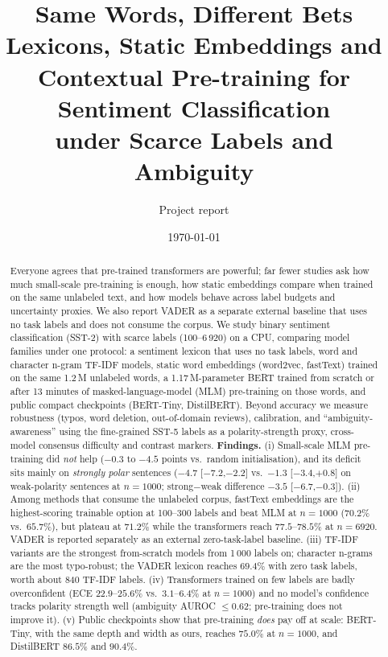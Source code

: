 \documentclass[11pt,a4paper]{article}
\title{\textbf{Same Words, Different Bets}\\[2pt]
\large Lexicons, Static Embeddings and Contextual Pre-training for Sentiment Classification\\ under Scarce Labels and Ambiguity}
\author{Project report}
\date{\today}
\begin{document}
\maketitle

\begin{abstract}
Everyone agrees that pre-trained transformers are powerful; far fewer studies ask how much small-scale pre-training is enough, how static embeddings compare when trained on the same unlabeled text, and how models behave across label budgets and uncertainty proxies. We also report VADER as a separate external baseline that uses no task labels and does not consume the corpus.
We study binary sentiment classification (SST-2) with scarce labels (100--6\,920) on a CPU, comparing model families under one protocol: a sentiment lexicon that uses no task labels, word and character n-gram TF-IDF models,
static word embeddings (word2vec, fastText) trained on the same 1.2\,M unlabeled words, a 1.17\,M-parameter BERT trained from scratch or after 13 minutes of masked-language-model (MLM) pre-training on those words, and public compact checkpoints (BERT-Tiny, DistilBERT).
Beyond accuracy we measure robustness (typos, word deletion, out-of-domain reviews), calibration, and ``ambiguity-awareness'' using the fine-grained SST-5 labels as a polarity-strength proxy, cross-model consensus difficulty and contrast markers.
\textbf{Findings.} (i) Small-scale MLM pre-training did \emph{not} help ($-0.3$ to $-4.5$ points vs.\ random initialisation), and its deficit sits mainly on \emph{strongly polar} sentences ($-4.7$ [$-7.2$,$-2.2$] vs.\ $-1.3$ [$-3.4$,$+0.8$] on weak-polarity sentences at $n{=}1000$; strong$-$weak difference $-3.5$ [$-6.7$,$-0.3$]).
(ii) Among methods that consume the unlabeled corpus, fastText embeddings are the highest-scoring trainable option at 100--300 labels and beat MLM at $n{=}1000$ ($70.2\%$ vs.\ $65.7\%$), but plateau at $71.2\%$ while the transformers reach $77.5$--$78.5\%$ at $n{=}6920$. VADER is reported separately as an external zero-task-label baseline.
(iii) TF-IDF variants are the strongest from-scratch models from 1\,000 labels on; character n-grams are the most typo-robust; the VADER lexicon reaches $69.4\%$ with zero task labels, worth about 840 TF-IDF labels.
(iv) Transformers trained on few labels are badly overconfident (ECE $22.9$--$25.6\%$ vs.\ $3.1$--$6.4\%$ at $n{=}1000$) and no model's confidence tracks polarity strength well (ambiguity AUROC $\le0.62$; pre-training does not improve it).
(v) Public checkpoints show that pre-training \emph{does} pay off at scale: BERT-Tiny, with the same depth and width as ours, reaches $75.0\%$ at $n{=}1000$, and DistilBERT $86.5\%$ and $90.4\%$.

\end{abstract}
\end{document}
